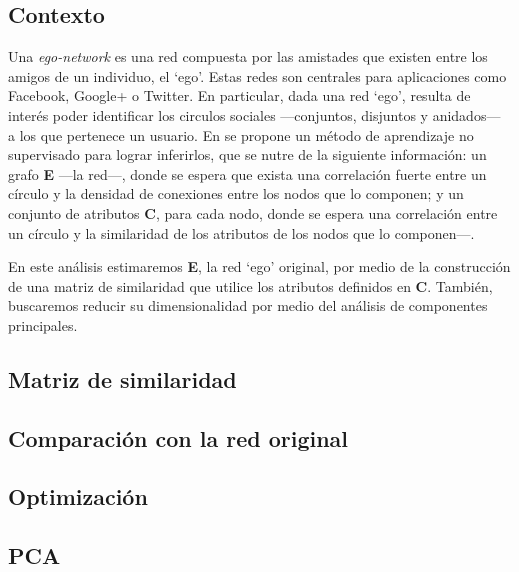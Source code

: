 
\vspace{2em}
\subsection{Contexto} Una \textit{ego-network}  es una red compuesta por las amistades que existen entre los amigos de un individuo, el `ego'. Estas redes son centrales para aplicaciones como Facebook, Google+ o Twitter. En particular, dada una red `ego', resulta de interés poder identificar los circulos sociales ---conjuntos, disjuntos y anidados--- a los que pertenece un usuario. En  se propone un método de aprendizaje no supervisado para lograr inferirlos, que se nutre de la siguiente información: un grafo \textbf{E} ---la red---, donde se espera que exista una correlación fuerte entre un círculo y la densidad de conexiones entre los nodos que lo componen; y un conjunto de atributos \textbf{C}, para cada nodo, donde se espera una correlación entre un círculo y la similaridad de los atributos de los nodos que lo componen---.

\vspace{1em}
En este análisis estimaremos \textbf{E}, la red `ego' original, por medio de la construcción de una matriz de similaridad que utilice los atributos definidos en \textbf{C}. También, buscaremos reducir su dimensionalidad por medio del análisis de componentes principales.





\vspace{2em}
\subsection{Matriz de similaridad}





\vspace{2em}
\subsection{Comparación con la red original}





\vspace{2em}
\subsection{Optimización}





\vspace{2em}
\subsection{PCA}
